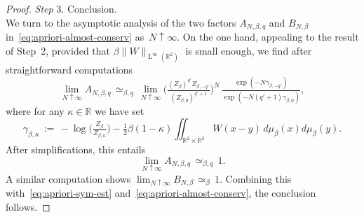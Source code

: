 \documentclass[a4paper,11pt,reqno,noindent]{amsart}
\theoremstyle{plain}
\numberwithin{equation}{section}
\newcommand{\R}{\mathbb R}
\newcommand{\3}{|\!|\!|}
\newcommand{\Ld}{\operatorname{L}}
\newcommand{\step}[1]{\noindent \textit{Step} #1.}
\begin{document}
\begin{proof}
\medskip
\step3 Conclusion.\\
We turn to the asymptotic analysis of the two factors $A_{N,\beta,q}$ and $B_{N,\beta}$ in~\eqref{eq:apriori-almost-conserv} as~$N\uparrow\infty$.
On the one hand, appealing to the result of Step~2, provided that $\beta\|W\|_{\Ld^\infty(\R^2)}$ is small enough,
we find after straightforward computations
\begin{equation*}
\lim_{N\uparrow\infty}A_{N,\beta,q}\,\simeq_{\beta,q}\,\lim_{N\uparrow\infty}\Big(\tfrac{(Z_\beta)^{q'}Z_{\beta,-q'}}{(Z_{\beta,0})^{q'+1}}\Big)^{N}\,\tfrac{\exp(-N\gamma_{\beta,-q'})}{\exp(-N(q'+1)\gamma_{\beta,0})},
\end{equation*}
where for any $\kappa\in\R$ we have set
\[\gamma_{\beta,\kappa}\,:=\,-\log\big(\tfrac{Z_\beta}{Z_{\beta,\kappa}}\big)- \tfrac12\beta(1-\kappa)\iint_{\R^2\times\R^2} W(x-y)\,d\mu_\beta(x)d\mu_\beta(y).\]
After simplifications, this entails
\begin{equation*}
\lim_{N\uparrow\infty}A_{N,\beta,q}\,\simeq_{\beta,q}\,1.
\end{equation*}
A similar computation shows
$\lim_{N\uparrow\infty}B_{N,\beta}\,\simeq_\beta\,1$.
Combining this with~\eqref{eq:apriori-sym-est} and~\eqref{eq:apriori-almost-conserv}, the conclusion follows.
\end{proof}
\end{document}
